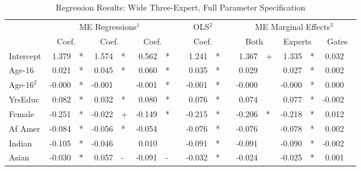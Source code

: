 \documentclass[12pt]{article}
\theoremstyle{definition}
\begin{document}
\begin{landscape}
\begin{table} \centering
  \caption{Regression Results: Wide Three-Expert, Full Parameter Specification}
    \begin{threeparttable}
      \begin{tabular}[l]{l r l r l r l c r l c r l r l r l}

\cmidrule{1-17}
& \multicolumn{6}{c}{ME Regressions$^{1}$} &&  \multicolumn{2}{c}{OLS$^{2}$} && \multicolumn{6}{c}{ME Marginal Effects$^{3}$} \\
\cmidrule(l){2-7}    \cmidrule(l){9-10}     \cmidrule(l){12-17}
& \multicolumn{2}{c}{Coef.} &  \multicolumn{2}{c}{Coef.} &  \multicolumn{2}{c}{Coef.}  && \multicolumn{2}{c}{Coef.} && \multicolumn{2}{c}{Both}    &  \multicolumn{2}{c}{Experts}  &  \multicolumn{2}{c}{Gates} \\
                \cmidrule(l){2-3} \cmidrule(l){4-5} \cmidrule(l){6-7} \cmidrule(l){9-10} \cmidrule(l){12-13} \cmidrule(l){14-15} \cmidrule(l){16-17}
Intercept             &  1.379 & *      &  1.574 & *      &  0.562 & *      &&  1.241 & *     &&  1.367 & +        &  1.335 & *        &  0.032 &        \\
Age-16                &  0.021 & *      &  0.045 & *      &  0.060 & *      &&  0.035 & *     &&  0.029 &          &  0.027 & *        &  0.002 &        \\
$\textrm{Age-16}^{2}$ & -0.000 & *      & -0.001 &        & -0.001 & *      && -0.001 & *     && -0.000 &          & -0.000 & *        &  0.000 &        \\
YrsEduc               &  0.082 & *      &  0.032 & *      &  0.080 & *      &&  0.076 & *     &&  0.074 &          &  0.077 & *        & -0.002 &        \\
Female                & -0.251 & *      & -0.022 & +      & -0.149 & *      && -0.215 & *     && -0.206 & *        & -0.218 & *        &  0.012 &        \\
Af Amer               & -0.084 & *      & -0.056 & *      & -0.054 &        && -0.076 & *     && -0.076 &          & -0.078 & *        &  0.002 &        \\
Indian                & -0.105 & *      & -0.046 &        &  0.010 &        && -0.091 & *     && -0.091 &          & -0.090 & *        & -0.002 &        \\
Asian                 & -0.030 & *      &  0.057 & -      & -0.091 & -      && -0.032 & *     && -0.024 &          & -0.025 & *        &  0.001 &        \\

\end{tabular}
\end{threeparttable}
\end{table}
\end{landscape}
\end{document}
